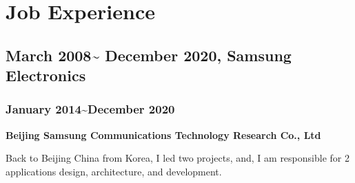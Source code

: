 \documentclass{article}
\begin{document}
\section{Job Experience}
\subsection{March 2008\~{} December 2020, Samsung Electronics}

\subsubsection{January 2014\~{}December 2020}
\textbf{Beijing Samsung Communications Technology Research Co., Ltd}

Back to Beijing China from Korea, I led two projects, and, I am responsible for 2 applications design, architecture, and development.
\end{document}
